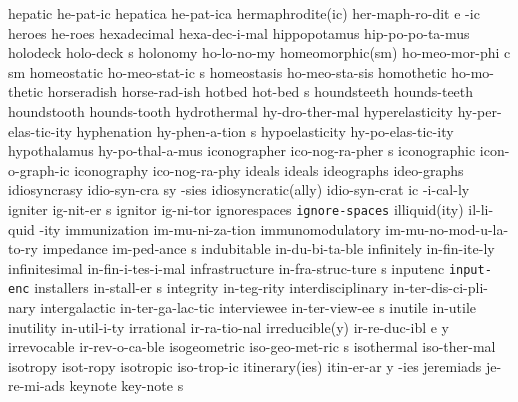 \1 hepatic		he-pat-ic
\1 hepatica		he-pat-ica		%
\3 hermaphrodite(ic)	her-maph-ro-dit e -ic
\1 heroes		he-roes
\1 hexadecimal		hexa-dec-i-mal
\NewWordtrue
\1 hippopotamus 	hip-po-po-ta-mus	%
\5 holodeck		holo-deck s		%
\1 holonomy		ho-lo-no-my
\3 homeomorphic(sm)	ho-meo-mor-phi c sm	%
\5 homeostatic		ho-meo-stat-ic s	%
\1 homeostasis		ho-meo-sta-sis		%
\1 homothetic		ho-mo-thetic
\1 horseradish		horse-rad-ish
\5 hotbed		hot-bed s		%
\1 houndsteeth		hounds-teeth		%
\1 houndstooth		hounds-tooth		%
\1 hydrothermal		hy-dro-ther-mal		%
\1 hyperelasticity	hy-per-elas-tic-ity	%
\5 hyphenation		hy-phen-a-tion s		%
\1 hypoelasticity	hy-po-elas-tic-ity	%
\1 hypothalamus 	hy-po-thal-a-mus 
\NewWordtrue
\5 iconographer		ico-nog-ra-pher s	%
\NewWordtrue
\1 iconographic		icon-o-graph-ic		%
\NewWordtrue
\1 iconography		ico-nog-ra-phy		%
\1 ideals		ideals
\1 ideographs		ideo-graphs
\6 idiosyncrasy 	idio-syn-cra sy -sies
\3 idiosyncratic(ally)	idio-syn-crat ic -i-cal-ly
\5 igniter		ig-nit-er s
\1 ignitor		ig-ni-tor
\1 ignorespaces 	{\tt\bs ignore-spaces}
\2 illiquid(ity)	il-li-quid -ity		%
\NewWordtrue
\1 immunization 	im-mu-ni-za-tion	%
\NewWordtrue
\1 immunomodulatory	im-mu-no-mod-u-la-to-ry	%
\5 impedance		im-ped-ance s
\1 indubitable		in-du-bi-ta-ble		%
\1 infinitely		in-fin-ite-ly
\1 infinitesimal	in-fin-i-tes-i-mal
\5 infrastructure	in-fra-struc-ture s
\1 inputenc		{\tt input-enc}		%
\5 installers		in-stall-er s		%
\1 integrity		in-teg-rity		%
\1 interdisciplinary	in-ter-dis-ci-pli-nary
\1 intergalactic	in-ter-ga-lac-tic
\5 interviewee		in-ter-view-ee s	%
\1 inutile		in-utile
\1 inutility		in-util-i-ty
\1 irrational		ir-ra-tio-nal		%
\3 irreducible(y)       ir-re-duc-ibl e y       %
\1 irrevocable		ir-rev-o-ca-ble
\5 isogeometric		iso-geo-met-ric s	%
\1 isothermal		iso-ther-mal		%
\1 isotropy		isot-ropy		%
\1 isotropic		iso-trop-ic		%
\3 itinerary(ies)	itin-er-ar y -ies
\1 jeremiads		je-re-mi-ads
\5 keynote		key-note s		%
